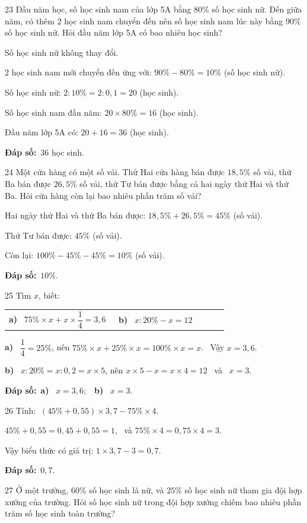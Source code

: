 \documentclass[11pt]{article}
\makeatletter
\newif\ifsol \solfalse
\renewcommand{\arraystretch}{1.35}
\providecommand{\AnsWord}{Đáp số}
\newcommand{\dapso}[1]{\par\textbf{\AnsWord:}\ #1}
\newcommand{\probsol}[1]{%
  \begin{lrbox}{\solmeasure}\begin{minipage}{\dimexpr\linewidth-24pt\relax}#1\end{minipage}\end{lrbox}%
  \ifsol
    \begin{solbox}#1\end{solbox}%
  \else
    \setlength{\solht}{\dimexpr\ht\solmeasure+\dp\solmeasure+0.85cm\relax}%
    \ifdim\solht<1.35cm\setlength{\solht}{1.35cm}\fi
    \begin{tcolorbox}[colback=white,colframe=Line,boxrule=0.8pt,arc=5pt,
      left=8pt,right=8pt,top=4pt,bottom=4pt,height=\solht]{\footnotesize\color{Slate}\itshape\WorkWord}\end{tcolorbox}%
  \fi}
\newcommand{\pa}[1]{\textbf{#1)}\ }
\newenvironment{cols2}{\par\vspace{3pt}\noindent\setlength{\tabcolsep}{0pt}\renewcommand{\arraystretch}{1.3}%
  \begin{tabular}{@{}>{\raggedright\arraybackslash\rule{0pt}{4.4ex}}p{0.48\linewidth}<{\rule[-2.3ex]{0pt}{0pt}}@{\hspace{0.03\linewidth}}>{\raggedright\arraybackslash\rule{0pt}{4.4ex}}p{0.48\linewidth}<{\rule[-2.3ex]{0pt}{0pt}}@{}}}%
  {\end{tabular}\par}
\newcommand{\gap}{\vspace{0.3cm}}
\def\WorkWord{Bài làm:}
\def\AnsWord{Đáp số}
\makeatother
\begin{document}
\gap
\begin{probbox}{23}{\relax}
Đầu năm học, số học sinh nam của lớp 5A bằng $80\%$ số học sinh nữ. Đến giữa năm, có thêm $2$ học sinh nam chuyển đến nên số học sinh nam lúc này bằng $90\%$ số học sinh nữ. Hỏi đầu năm lớp 5A có bao nhiêu học sinh?
\end{probbox}
\probsol{
Số học sinh nữ không thay đổi.\par
$2$ học sinh nam mới chuyển đến ứng với: $90\%-80\%=10\%$ (số học sinh nữ).\par
Số học sinh nữ: $2:10\%=2:0{,}1=20$ (học sinh).\par
Số học sinh nam đầu năm: $20\times80\%=16$ (học sinh).\par
Đầu năm lớp 5A có: $20+16=36$ (học sinh).
\dapso{$36$ học sinh.}}
\gap
\begin{probbox}{24}{\relax}
Một cửa hàng có một số vải. Thứ Hai cửa hàng bán được $18{,}5\%$ số vải, thứ Ba bán được $26{,}5\%$ số vải, thứ Tư bán được bằng cả hai ngày thứ Hai và thứ Ba. Hỏi cửa hàng còn lại bao nhiêu phần trăm số vải?
\end{probbox}
\probsol{
Hai ngày thứ Hai và thứ Ba bán được: $18{,}5\%+26{,}5\%=45\%$ (số vải).\par
Thứ Tư bán được: $45\%$ (số vải).\par
Còn lại: $100\%-45\%-45\%=10\%$ (số vải).
\dapso{$10\%$.}}
\gap
\begin{probbox}{25}{\relax}
Tìm $x$, biết:
\begin{cols2}
\pa{a} $75\%\times x+x\times\dfrac14=3{,}6$ & \pa{b} $x:20\%-x=12$
\end{cols2}
\end{probbox}
\probsol{
\pa{a} $\dfrac14=25\%$, nên $75\%\times x+25\%\times x=100\%\times x=x$. \ Vậy $x=3{,}6$.\par
\pa{b} $x:20\%=x:0{,}2=x\times5$, nên $x\times5-x=x\times4=12$ \ và \ $x=3$.
\dapso{\pa{a} $x=3{,}6$;\ \ \pa{b} $x=3$.}}
\gap
\begin{probbox}{26}{\relax}
Tính: $\ (45\%+0{,}55)\times3{,}7-75\%\times4$.
\end{probbox}
\probsol{
$45\%+0{,}55=0{,}45+0{,}55=1$, \ và $75\%\times4=0{,}75\times4=3$.\par
Vậy biểu thức có giá trị: $1\times3{,}7-3=0{,}7$.
\dapso{$0{,}7$.}}
\gap
\begin{probbox}{27}{\relax}
Ở một trường, $60\%$ số học sinh là nữ, và $25\%$ số học sinh nữ tham gia đội hợp xướng của trường. Hỏi số học sinh nữ trong đội hợp xướng chiếm bao nhiêu phần trăm số học sinh toàn trường?
\end{probbox}
\end{document}
